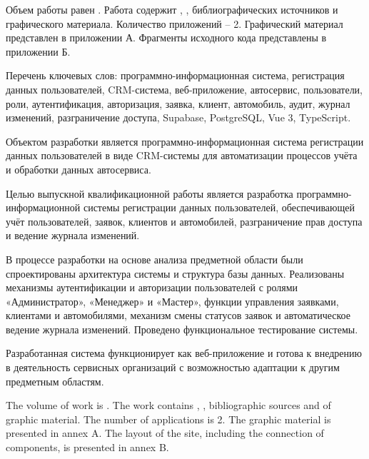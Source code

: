 
Объем работы равен . Работа содержит , ,  библиографических источников и  графического материала. Количество приложений – 2. Графический материал представлен в приложении А. Фрагменты исходного кода представлены в приложении Б.

Перечень ключевых слов: программно-информационная система, регистрация данных пользователей, CRM-система, веб-приложение, автосервис, пользователи, роли, аутентификация, авторизация, заявка, клиент, автомобиль, аудит, журнал изменений, разграничение доступа, Supabase, PostgreSQL, Vue 3, TypeScript.

Объектом разработки является программно-информационная система регистрации данных пользователей в виде CRM-системы для автоматизации процессов учёта и обработки данных автосервиса.

Целью выпускной квалификационной работы является разработка программно-информационной системы регистрации данных пользователей, обеспечивающей учёт пользователей, заявок, клиентов и автомобилей, разграничение прав доступа и ведение журнала изменений.

В процессе разработки на основе анализа предметной области были спроектированы архитектура системы и структура базы данных. Реализованы механизмы аутентификации и авторизации пользователей с ролями «Администратор», «Менеджер» и «Мастер», функции управления заявками, клиентами и автомобилями, механизм смены статусов заявок и автоматическое ведение журнала изменений. Проведено функциональное тестирование системы.

Разработанная система функционирует как веб-приложение и готова к внедрению в деятельность сервисных организаций с возможностью адаптации к другим предметным областям.

  
The volume of work is . The work contains , ,  bibliographic sources and  of graphic material. The number of applications is 2. The graphic material is presented in annex A. The layout of the site, including the connection of components, is presented in annex B.


